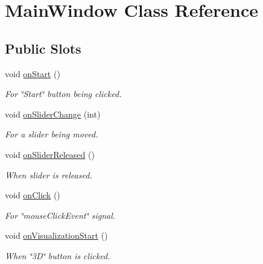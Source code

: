 \hypertarget{classMainWindow}{\section{\-Main\-Window \-Class \-Reference}
\label{classMainWindow}
}
\subsection*{\-Public \-Slots}
\begin{DoxyCompactItemize}
\item 
\hypertarget{classMainWindow_a8b6ad2f7b2f4dc3de571d2be7f09c161}{void \hyperlink{classMainWindow_a8b6ad2f7b2f4dc3de571d2be7f09c161}{on\-Start} ()}\label{classMainWindow_a8b6ad2f7b2f4dc3de571d2be7f09c161}

\begin{DoxyCompactList}\small\item\em \-For \char`\"{}\-Start\char`\"{} button being clicked. \end{DoxyCompactList}\item 
\hypertarget{classMainWindow_acd44b33fa22c8c0962fa394b0afd49d1}{void \hyperlink{classMainWindow_acd44b33fa22c8c0962fa394b0afd49d1}{on\-Slider\-Change} (int)}\label{classMainWindow_acd44b33fa22c8c0962fa394b0afd49d1}

\begin{DoxyCompactList}\small\item\em \-For a slider being moved. \end{DoxyCompactList}\item 
\hypertarget{classMainWindow_afb074f72220ef674ca57159eb6008dd3}{void \hyperlink{classMainWindow_afb074f72220ef674ca57159eb6008dd3}{on\-Slider\-Released} ()}\label{classMainWindow_afb074f72220ef674ca57159eb6008dd3}

\begin{DoxyCompactList}\small\item\em \-When slider is released. \end{DoxyCompactList}\item 
\hypertarget{classMainWindow_aeea781512a13aebbe2a3d54830cb28c0}{void \hyperlink{classMainWindow_aeea781512a13aebbe2a3d54830cb28c0}{on\-Click} ()}\label{classMainWindow_aeea781512a13aebbe2a3d54830cb28c0}

\begin{DoxyCompactList}\small\item\em \-For \char`\"{}mouse\-Click\-Event\char`\"{} signal. \end{DoxyCompactList}\item 
\hypertarget{classMainWindow_ad39be1f55d4f052e51a9c43080b0e974}{void \hyperlink{classMainWindow_ad39be1f55d4f052e51a9c43080b0e974}{on\-Visualization\-Start} ()}\label{classMainWindow_ad39be1f55d4f052e51a9c43080b0e974}

\begin{DoxyCompactList}\small\item\em \-When \char`\"{}3\-D\char`\"{} button is clicked. \end{DoxyCompactList}\end{DoxyCompactItemize}
